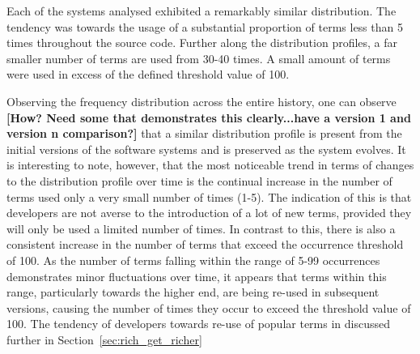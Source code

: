 Each of the systems analysed exhibited a remarkably similar distribution. The tendency was towards the usage of a substantial proportion of terms less than 5 times throughout the source code. Further along the distribution profiles, a far smaller number of terms are used from 30-40 times. A small amount of terms were used in excess of the defined threshold value of 100.

Observing the frequency distribution across the entire history, one can observe \textbf{[How? Need some that demonstrates this clearly...have a version 1 and version n comparison?]} that a similar distribution profile is present from the initial versions of the software systems and is preserved as the system evolves. It is interesting to note, however, that the most noticeable trend in terms of changes to the distribution profile over time is the continual increase in the number of terms used only a very small number of times (1-5). The indication of this is that developers are not averse to the introduction of a lot of new terms, provided they will only be used a limited number of times. In contrast to this, there is also a consistent increase in the number of terms that exceed the occurrence threshold of 100. As the number of terms falling within the range of 5-99 occurrences demonstrates minor fluctuations over time, it appears that terms within this range, particularly towards the higher end, are being re-used in subsequent versions, causing the number of times they occur to exceed the threshold value of 100. The tendency of developers towards re-use of popular terms in discussed further in Section~\ref{sec:rich_get_richer}






